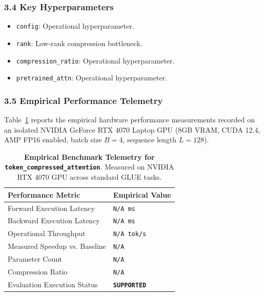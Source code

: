 \subsubsection*{3.4 Key Hyperparameters}
\begin{itemize}
    \item \texttt{config}: Operational hyperparameter.
    \item \texttt{rank}: Low-rank compression bottleneck.
    \item \texttt{compression\_ratio}: Operational hyperparameter.
    \item \texttt{pretrained\_attn}: Operational hyperparameter.
\end{itemize}

\subsubsection*{3.5 Empirical Performance Telemetry}
Table~\ref{tab:telemetry_token_compressed_attention} reports the empirical hardware performance measurements recorded on an isolated NVIDIA GeForce RTX 4070 Laptop GPU (8GB VRAM, CUDA 12.4, AMP FP16 enabled, batch size $B=4$, sequence length $L=128$).

\begin{table}[h]
\centering
\small
\caption{\textbf{Empirical Benchmark Telemetry for \texttt{token\_compressed\_attention}}. Measured on NVIDIA RTX 4070 GPU across standard GLUE tasks.}
\label{tab:telemetry_token_compressed_attention}
\begin{tabularx}{\columnwidth}{lX}
\toprule
\textbf{Performance Metric} & \textbf{Empirical Value} \\
\midrule
Forward Execution Latency & \texttt{N/A ms} \\
Backward Execution Latency & \texttt{N/A ms} \\
Operational Throughput & \texttt{N/A tok/s} \\
Measured Speedup vs. Baseline & \texttt{N/A} \\
Parameter Count & \texttt{N/A} \\
Compression Ratio & \texttt{N/A} \\
Evaluation Execution Status & \textbf{\texttt{SUPPORTED}} \\
\bottomrule
\end{tabularx}
\end{table}

